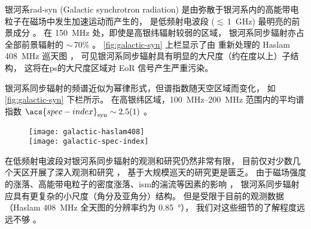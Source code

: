 银河系\acs{rad-syn} (Galactic synchrotron radiation)
是由弥散于银河系内的高能带电粒子在磁场中发生加速运动而产生的，
是低频射电波段 ($\lesssim$\,\SI{1}{\GHz}) 最明亮的前景成分
\cite{bernardi2009,ghosh2012}。
在 \SI{150}{\MHz} 处，即使是高银纬辐射较弱的区域，
银河系同步辐射亦占全部前景辐射的 $\sim$\,70\% \cite{shaver1999}。
\autoref{fig:galactic-syn} 上栏显示了由 
重新处理的 Haslam \SI{408}{\MHz} 巡天图 \cite{haslam1982}，
可见银河系同步辐射具有明显的大尺度（约在度以上）子结构，
这将在\ac{ps}的大尺度区域对 EoR 信号产生严重污染。

银河系同步辐射的频谱近似为幂律形式，但谱指数随天空区域而变化，
如\autoref{fig:galactic-syn} 下栏所示。
在高银纬区域，\SIrange{100}{200}{\MHz} 范围内的平均谱指数
$\acs{spec-index}_{\R{syn}} \sim \num{2.5 +- 0.1}$ \cite{rogers2008}。

\begin{figure}[htp]
  \centering
  \texttt{[image: galactic-haslam408]}
  \\\medskip
  \texttt{[image: galactic-spec-index]}
  \label{fig:galactic-syn}
\end{figure}

在低频射电波段对银河系同步辐射的观测和研究仍然非常有限，
目前仅对少数几个天区开展了深入观测和研究
\cite{bernardi2009,ghosh2012,iacobelli2013,choudhuri2017}，
基于大规模巡天的研究更是匮乏。
由于磁场强度的涨落、高能带电粒子的密度涨落、\ac{ism}的湍流等因素的影响
\cite{waelkens2009,lazarian2012syn,iacobelli2013}，
银河系同步辐射应具有更复杂的小尺度（角分及亚角分）结构。
但是受限于目前的观测数据（Haslam \SI{408}{\MHz} 全天图的分辨率约为 \SI{0.85}{\degree}），
我们对这些细节的了解程度远远不够 \cite{ali2016}。

